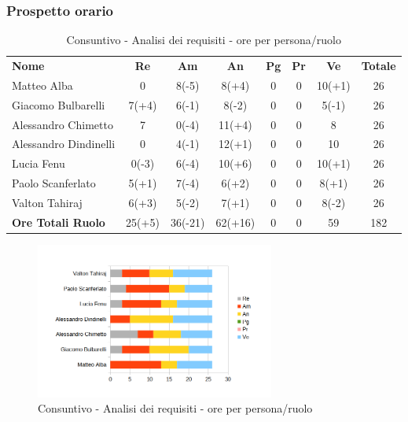 \subsubsection{Prospetto orario}
	\begin{table} [h!]
	\begin{center}
		\begin{tabular} {m{3.5cm} c c c c c c c }
			\rowcolor{lightgray}
			\textbf{Nome} & \textbf{Re} & \textbf{Am} & \textbf{An} & \textbf{Pg} &\textbf{Pr} & \textbf{Ve} & \textbf{Totale} \\ 
			Matteo Alba & 0 & 8(-5) &8(+4) & 0 & 0 & 10(+1) & 26  \\ 
			Giacomo Bulbarelli & 7(+4) & 6(-1) & 8(-2) & 0 & 0 & 5(-1) & 26 \\ 
			Alessandro Chimetto & 7 & 0(-4) & 11(+4) & 0 & 0 & 8 & 26 \\
			Alessandro Dindinelli & 0 & 4(-1) & 12(+1) & 0 & 0 & 10 & 26 \\
			Lucia Fenu & 0(-3) & 6(-4) & 10(+6) & 0 & 0 & 10(+1) & 26 \\
			Paolo Scanferlato & 5(+1) & 7(-4) & 6(+2) & 0 & 0 & 8(+1) & 26 \\
			Valton Tahiraj & 6(+3) & 5(-2) &7(+1) & 0 & 0 & 8(-2) & 26 \\
			\textbf{Ore Totali Ruolo} & 25(+5) & 36(-21) & 62(+16) & 0 & 0 & 59 & 182\\
		
		\end{tabular}
		\caption{Consuntivo - Analisi dei requisiti - ore per persona/ruolo}
	\end{center}
\end{table}

	\begin{figure} [h!]
	\centering
	\includegraphics[width=0.7\textwidth]{res/img/grafici/consuntivo-barre_ ore analisi requisiti.png}
	\caption{Consuntivo - Analisi dei requisiti - ore per persona/ruolo} 
\end{figure}


